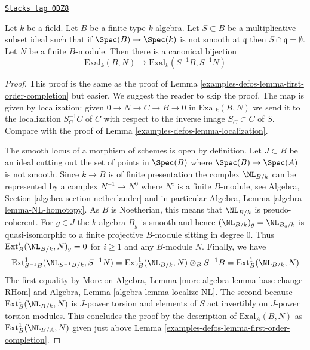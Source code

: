 \begin{lemma}
\label{examples-defos-lemma-first-order-localization}
\href{https://stacks.math.columbia.edu/tag/0DZ8}{\texttt{Stacks tag 0DZ8}}

Let $k$ be a field. Let $B$ be a finite type $k$-algebra.
Let $S \subset B$ be a multiplicative subset ideal such that
if $\Spec(B) \to \Spec(k)$ is not smooth at $\mathfrak q$
then $S \cap \mathfrak q = \emptyset$.
Let $N$ be a finite $B$-module.
Then there is a canonical bijection
$$
\text{Exal}_k(B, N) \to \text{Exal}_k(S^{-1}B, S^{-1}N)
$$
\end{lemma}

\begin{proof}
This proof is the same as the proof of
Lemma \ref{examples-defos-lemma-first-order-completion} but easier. We suggest the
reader to skip the proof.
The map is given by localization: given $0 \to N \to C \to B \to 0$
in $\text{Exal}_k(B, N)$ we send it to the localization $S_C^{-1}C$
of $C$ with respect to the inverse image $S_C \subset C$ of $S$.
Compare with the proof of Lemma \ref{examples-defos-lemma-localization}.

\medskip\noindent
The smooth locus of a morphism of schemes is open by definition.
Let $J \subset B$ be an ideal cutting out the set of points
in $\Spec(B)$ where $\Spec(B) \to \Spec(A)$ is not smooth.
Since $k \to B$ is of finite presentation the complex
$\NL_{B/k}$ can be represented by a complex
$N^{-1} \to N^0$ where $N^i$ is a finite $B$-module, see
Algebra, Section \ref{algebra-section-netherlander} and
in particular
Algebra, Lemma \ref{algebra-lemma-NL-homotopy}.
As $B$ is Noetherian, this means that $\NL_{B/k}$
is pseudo-coherent. For $g \in J$ the $k$-algebra $B_g$
is smooth and hence $(\NL_{B/k})_g = \NL_{B_g/k}$
is quasi-isomorphic to a finite projective $B$-module sitting in degree $0$.
Thus $\text{Ext}^i_B(\NL_{B/k}, N)_g = 0$ for $i \geq 1$
and any $B$-module $N$. Finally, we have
$$
\text{Ext}^1_{S^{-1}B}(\NL_{S^{-1}B/k}, S^{-1}N) =
\text{Ext}^1_B(\NL_{B/k}, N) \otimes_B S^{-1}B =
\text{Ext}^1_B(\NL_{B/k}, N)
$$
The first equality by
More on Algebra, Lemma \ref{more-algebra-lemma-base-change-RHom}
and Algebra, Lemma \ref{algebra-lemma-localize-NL}.
The second because $\text{Ext}^1_B(\NL_{B/k}, N)$ is $J$-power
torsion and elements of $S$ act invertibly on $J$-power torsion modules.
This concludes the proof by the description of $\text{Exal}_A(B, N)$
as $\text{Ext}^1_B(\NL_{B/A}, N)$ given just above
Lemma \ref{examples-defos-lemma-first-order-completion}.
\end{proof}

